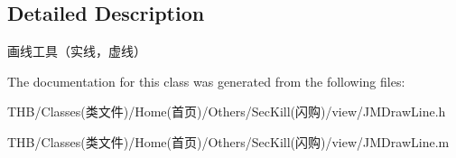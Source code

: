\subsection{Detailed Description}
画线工具（实线，虚线） 

The documentation for this class was generated from the following files\+:\begin{DoxyCompactItemize}
\item 
T\+H\+B/\+Classes(类文件)/\+Home(首页)/\+Others/\+Sec\+Kill(闪购)/view/J\+M\+Draw\+Line.\+h\item 
T\+H\+B/\+Classes(类文件)/\+Home(首页)/\+Others/\+Sec\+Kill(闪购)/view/J\+M\+Draw\+Line.\+m\end{DoxyCompactItemize}
